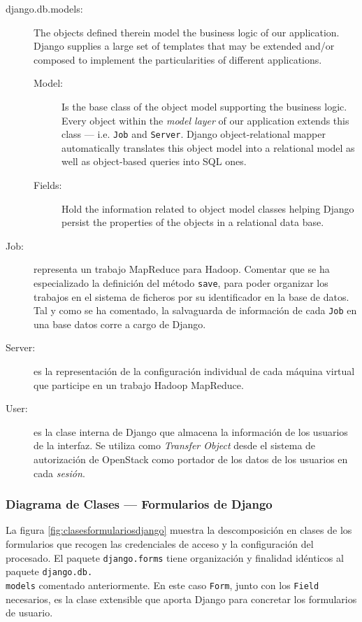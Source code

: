 \begin{description}
 \item[django.db.models:] The objects defined therein model the business logic of our application. Django supplies a large set of templates that may be extended and/or composed to implement the particularities of different applications.
  \begin{description}
   \item[Model:] Is the base class of the object model supporting the business logic. Every object within the \emph{model layer} of our application extends this class --- i.e. \texttt{Job} and \texttt{Server}. Django object-relational mapper automatically translates this object model into a relational model as well as object-based queries into SQL ones.
   \item[Fields:] Hold the information related to object model classes helping Django persist the properties of the objects in a relational data base.
  \end{description}
 \item[Job:] representa un trabajo MapReduce para Hadoop. Comentar que se ha especializado la definici\'on del m\'etodo \texttt{save}, para poder organizar los trabajos en el sistema de ficheros por su identificador en la base de datos. Tal y como se ha comentado, la salvaguarda de informaci\'on de cada \texttt{Job} en una base datos corre a cargo de Django.
 \item[Server:] es la representaci\'on de la configuraci\'on individual de cada m\'aquina virtual que participe en un trabajo Hadoop MapReduce.
 \item[User:] es la clase interna de Django que almacena la informaci\'on de los usuarios de la interfaz. Se utiliza como \emph{Transfer Object} desde el sistema de autorizaci\'on de OpenStack como portador de los datos de los usuarios en cada \emph{sesi\'on}.
\end{description}


\subsubsection{Diagrama de Clases --- Formularios de Django}\label{subsubsec:clasesformulariosdjango}
\noindent La figura \ref{fig:clasesformulariosdjango} muestra la descomposici\'on en clases de los formularios que recogen las credenciales de acceso y la configuraci\'on del procesado. El paquete \texttt{django.forms} tiene organizaci\'on y finalidad id\'enticos al paquete \texttt{django.db.\\models} comentado anteriormente. En este caso \texttt{Form}, junto con los \texttt{Field} necesarios, es la clase extensible que aporta Django para concretar los formularios de usuario.

